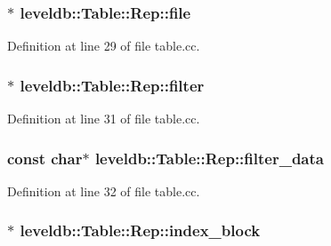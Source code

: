 \subsubsection[{file}]{$\ast$ leveldb\+::\+Table\+::\+Rep\+::file}\label{structleveldb_1_1_table_1_1_rep_a5b96b0d545bb3dbe2bccdefab1a83092}


Definition at line 29 of file table.\+cc.

\hypertarget{structleveldb_1_1_table_1_1_rep_a35acf83732a3dea3df5869cb05c1cb5f}{}
\subsubsection[{filter}]{$\ast$ leveldb\+::\+Table\+::\+Rep\+::filter}\label{structleveldb_1_1_table_1_1_rep_a35acf83732a3dea3df5869cb05c1cb5f}


Definition at line 31 of file table.\+cc.

\hypertarget{structleveldb_1_1_table_1_1_rep_a2dd458aa96c0a357414f13354810cea9}{}
\subsubsection[{filter\+\_\+data}]{\setlength{\rightskip}{0pt plus 5cm}const char$\ast$ leveldb\+::\+Table\+::\+Rep\+::filter\+\_\+data}\label{structleveldb_1_1_table_1_1_rep_a2dd458aa96c0a357414f13354810cea9}


Definition at line 32 of file table.\+cc.

\hypertarget{structleveldb_1_1_table_1_1_rep_ae69d991c9b8ec7330b22acc06a932fe8}{}
\subsubsection[{index\+\_\+block}]{$\ast$ leveldb\+::\+Table\+::\+Rep\+::index\+\_\+block}\label{structleveldb_1_1_table_1_1_rep_ae69d991c9b8ec7330b22acc06a932fe8}


